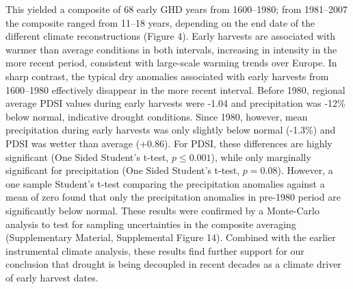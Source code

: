 \documentclass[final]{nature}
\begin{document}
\indent This yielded a composite of 68 early GHD years from 1600--1980; from 1981--2007 the composite ranged from 11--18 years, depending on the end date of the different climate reconstructions (Figure 4). Early harvests are associated with warmer than average conditions in both intervals, increasing in intensity in the more recent period, consistent with large-scale warming trends over Europe. In sharp contrast, the typical dry anomalies associated with early harvests from 1600--1980 effectively disappear in the more recent interval. Before 1980, regional average PDSI values during early harvests were -1.04 and precipitation was -12\% below normal, indicative drought conditions. Since 1980, however, mean precipitation during early harvests was only slightly below normal (-1.3\%) and PDSI was wetter than average (+0.86). For PDSI, these differences are highly significant (One Sided Student's t-test, $p\le0.001$), while only marginally significant for precipitation (One Sided Student's t-test, $p=0.08$). However, a one sample Student's t-test comparing the precipitation anomalies against a mean of zero found that only the precipitation anomalies in pre-1980 period are significantly below normal. These results were confirmed by a Monte-Carlo analysis to test for sampling uncertainties in the composite averaging (Supplementary Material, Supplemental Figure 14). Combined with the earlier instrumental climate analysis, these results find further support for our conclusion that drought is being decoupled in recent decades as a climate driver of early harvest dates.
\end{document}
